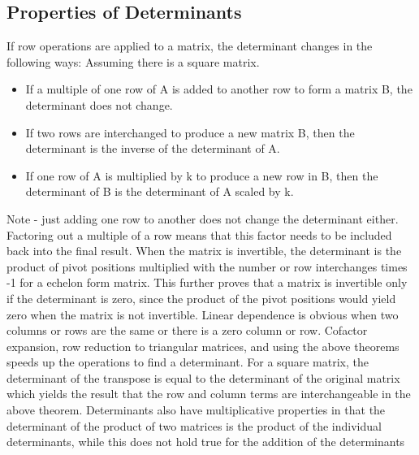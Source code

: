 \documentclass[12pt]{article}
\begin{document}
\subsection{Properties of Determinants}
If row operations are applied to a matrix, the determinant changes in the following ways:
\newline
\newline
\newline
\newline
Assuming there is a square matrix.
\begin{itemize}
    \item If a multiple of one row of A is added to another row to form a matrix B, the determinant does not change. 
    \item If two rows are interchanged to produce a new matrix B, then the determinant is the inverse of the determinant of A.
    \item If one row of A is multiplied by k to produce a new row in B, then the determinant of B is the determinant of A scaled by k.
\end{itemize}
Note - just adding one row to another does not change the determinant either. Factoring out a multiple of a row means that this factor needs to be included %
back into the final result. When the matrix is invertible, the determinant is the product of pivot positions multiplied with the number or row interchanges times -1
for a echelon form matrix. This further proves that a matrix is invertible only if the determinant is zero, since the product of the pivot positions would %
yield zero when the matrix is not invertible. Linear dependence is obvious when two columns or rows are the same or there is a zero column or row. Cofactor %
expansion, row reduction to triangular matrices, and using the above theorems speeds up the operations to find a determinant. For a square matrix, the determinant %
of the transpose is equal to the determinant of the original matrix which yields the result that the row and column terms are interchangeable in the above theorem. %
Determinants also have multiplicative properties in that the determinant of the product of two matrices is the product of the individual determinants, while this %
does not hold true for the addition of the determinants
\end{document}
